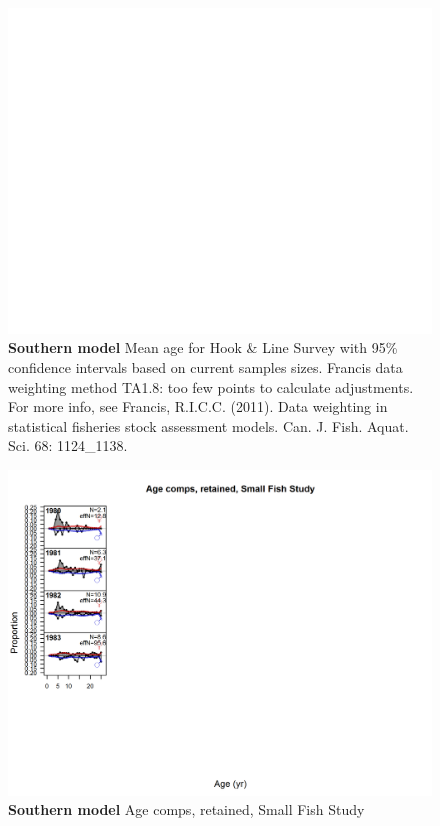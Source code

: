 \documentclass[12pt,]{article}
\begin{document}
\begin{figure}[htbp]
\centering
\includegraphics{./tex2pdf.8516/f0351f104fc96d4e4a7fe565ad1428f03b243a26.png}
\caption{\textbf{Southern model} Mean age for Hook \& Line Survey with
95\% confidence intervals based on current samples sizes. Francis data
weighting method TA1.8: too few points to calculate adjustments. For
more info, see Francis, R.I.C.C. (2011). Data weighting in statistical
fisheries stock assessment models. Can. J. Fish. Aquat. Sci. 68:
1124\_1138.
\label{fig:mod2_4_comp_agefit_data_weighting_TA1.8_Hook & Line Survey}}
\end{figure}

\begin{figure}[htbp]
\centering
\includegraphics{./r4ss/plots_mod2/comp_agefit_flt6mkt2.png}
\caption{\textbf{Southern model} Age comps, retained, Small Fish Study
\label{fig:mod2_5_comp_agefit_flt6mkt2}}
\end{figure}
\end{document}
